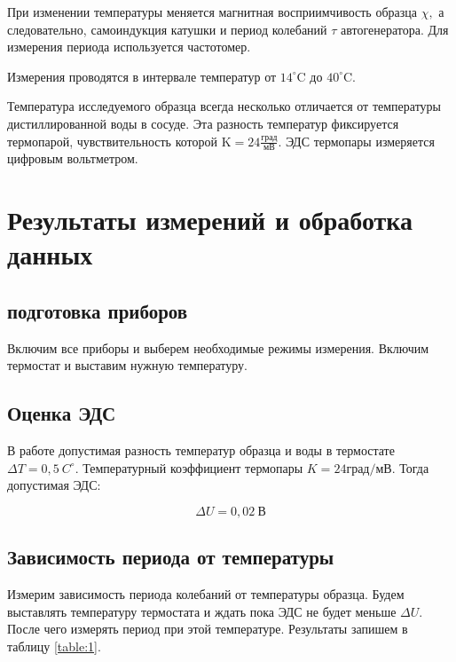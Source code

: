 \documentclass[a4paper,12pt]{article}
\begin{document}
При изменении температуры меняется магнитная восприимчивость образца $\chi,$ а следовательно, самоиндукция катушки и период колебаний $\tau$ автогенератора. Для измерения периода используется частотомер.

Измерения проводятся в интервале температур от $14^{\circ} \mathrm{C}$ до $40^{\circ} \mathrm{C}.$ 

Температура исследуемого образца всегда несколько отличается от температуры дистиллированной воды в сосуде. Эта разность температур фиксируется термопарой, чувствительность которой $\mathrm{K}=24\frac{\text{град}}{\text{мВ}}$. ЭДС термопары измеряется цифровым вольтметром.

\section{Результаты измерений и обработка данных}

\subsection{подготовка приборов}

Включим все приборы и выберем необходимые режимы измерения. Включим термостат и выставим нужную температуру.

\subsection{Оценка ЭДС}

В работе допустимая разность температур образца и воды в термостате $\Delta T = 0,5 \ C^\circ$. Температурный коэффициент термопары $K = 24 \text{град}/\text{мВ}$. Тогда допустимая ЭДС:

\begin{equation*}
    \Delta U = 0,02 \ \text{В}
\end{equation*}

\subsection{Зависимость периода от температуры}

Измерим зависимость периода колебаний от температуры образца. Будем выставлять температуру термостата и ждать пока ЭДС не будет меньше $\Delta U$. После чего измерять период при этой температуре. Результаты запишем в таблицу \ref{table:1}.
\end{document}
